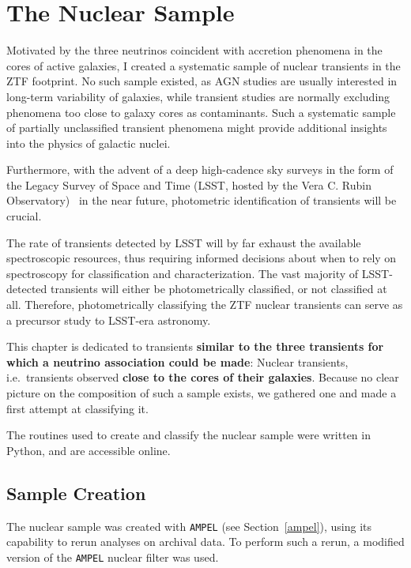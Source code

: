 \chapter{The Nuclear Sample}\label{nucsam}
Motivated by the three neutrinos coincident with accretion phenomena in the cores of active galaxies, I created a systematic sample of nuclear transients in the ZTF footprint. No such sample existed, as AGN studies are usually interested in long-term variability of galaxies, while transient studies are normally excluding phenomena too close to galaxy cores as contaminants. Such a systematic sample of partially unclassified transient phenomena might provide additional insights into the physics of galactic nuclei.

Furthermore, with the advent of a deep high-cadence sky surveys in the form of the Legacy Survey of Space and Time (LSST, hosted by the Vera C. Rubin Observatory)~ in the near future, photometric identification of transients will be crucial.

The rate of transients detected by LSST will by far exhaust the available spectroscopic resources, thus requiring informed decisions about when to rely on spectroscopy for classification and characterization. The vast majority of LSST-detected transients will either be photometrically classified, or not classified at all. Therefore, photometrically classifying the ZTF nuclear transients can serve as a precursor study to LSST-era astronomy.

This chapter is dedicated to transients \textbf{similar to the three transients for which a neutrino association could be made}: Nuclear transients, i.e.~transients observed \textbf{close to the cores of their galaxies}. Because no clear picture on the composition of such a sample exists, we gathered one and made a first attempt at classifying it.

The routines used to create and classify the nuclear sample were written in Python, and are accessible online.

\section{Sample Creation}
The nuclear sample was created with \texttt{AMPEL} (see Section~\ref{ampel}), using its capability to rerun analyses on archival data. To perform such a rerun, a modified version of the \texttt{AMPEL} nuclear filter was used.

